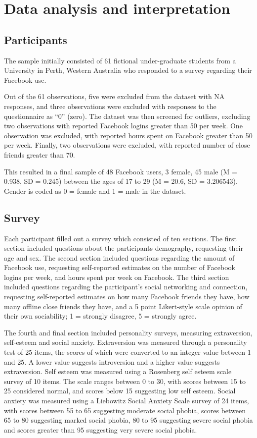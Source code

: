 \section{Data analysis and interpretation}

\subsection{Participants}

The sample initially consisted of 61 fictional under-graduate students from a University in Perth, Western Australia who responded to a survey regarding their Facebook use. 

Out of the 61 observations, five were excluded from the dataset with NA responses, and three observations were excluded with responses to the questionnaire as ``0'' (zero). The dataset was then screened for outliers, excluding two observations with reported Facebook logins greater than 50 per week. One observation was excluded, with reported hours spent on Facebook greater than 50 per week. Finally, two observations were excluded, with reported number of close friends greater than 70.

This resulted in a final sample of 48 Facebook users, 3 female, 45 male (M = 0.938, SD = 0.245) between the ages of 17 to 29 (M = 20.6, SD = 3.206543). Gender is coded as 0 = female and 1 = male in the dataset.

\subsection{Survey}

Each participant filled out a survey which consisted of ten sections. The first section included questions about the participants demography, requesting their age and sex. The second section included questions regarding the amount of Facebook use, requesting self-reported estimates on the number of Facebook logins per week, and hours spent per week on Facebook. The third section included questions regarding the participant's social networking and connection, requesting self-reported estimates on how many Facebook friends they have, how many offline close friends they have, and a 5 point Likert-style scale opinion of their own sociability; 1 = strongly disagree, 5 = strongly agree. 

The fourth and final section included personality surveys, measuring extraversion, self-esteem and social anxiety. Extraversion was measured through a personality test of 25 items, the scores of which were converted to an integer value between 1 and 25. A lower value suggests introversion and a higher value suggests extraversion. Self esteem was measured using a Rosenberg self esteem scale survey of 10 items. The scale ranges between 0 to 30, with scores between 15 to 25 considered normal, and scores below 15 suggesting low self esteem. Social anxiety was measured using a Liebowitz Social Anxiety Scale survey of 24 items, with scores between 55 to 65 suggesting moderate social phobia, scores between 65 to 80 suggesting marked social phobia, 80 to 95 suggesting severe social phobia and scores greater than 95 suggesting very severe social phobia.

